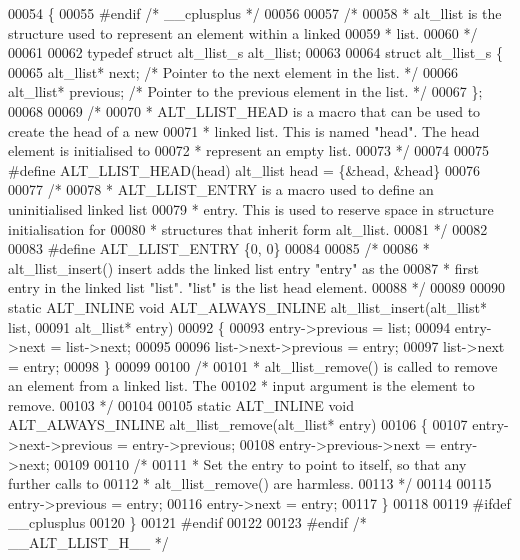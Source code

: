 \begin{DoxyCode}
00054 \{
00055 \textcolor{preprocessor}{#endif }\textcolor{comment}{/* \_\_cplusplus */}\textcolor{preprocessor}{}
00056 
00057 \textcolor{comment}{/*}
00058 \textcolor{comment}{ * alt\_llist is the structure used to represent an element within a linked}
00059 \textcolor{comment}{ * list.}
00060 \textcolor{comment}{ */}
00061 
00062 \textcolor{keyword}{typedef} \textcolor{keyword}{struct }alt_llist_s alt_llist;
00063 
00064 \textcolor{keyword}{struct }alt_llist_s \{
00065   alt_llist* next;     \textcolor{comment}{/* Pointer to the next element in the list. */}
00066   alt_llist* previous; \textcolor{comment}{/* Pointer to the previous element in the list. */}
00067 \};
00068 
00069 \textcolor{comment}{/*}
00070 \textcolor{comment}{ * ALT\_LLIST\_HEAD is a macro that can be used to create the head of a new }
00071 \textcolor{comment}{ * linked list. This is named "head". The head element is initialised to }
00072 \textcolor{comment}{ * represent an empty list.  }
00073 \textcolor{comment}{ */}
00074 
00075 \textcolor{preprocessor}{#define ALT\_LLIST\_HEAD(head) alt\_llist head = \{&head, &head\}}
00076 
00077 \textcolor{comment}{/*}
00078 \textcolor{comment}{ * ALT\_LLIST\_ENTRY is a macro used to define an uninitialised linked list}
00079 \textcolor{comment}{ * entry. This is used to reserve space in structure initialisation for}
00080 \textcolor{comment}{ * structures that inherit form alt\_llist.}
00081 \textcolor{comment}{ */}
00082 
00083 \textcolor{preprocessor}{#define ALT\_LLIST\_ENTRY \{0, 0\}}
00084 
00085 \textcolor{comment}{/*}
00086 \textcolor{comment}{ * alt\_llist\_insert() insert adds the linked list entry "entry" as the }
00087 \textcolor{comment}{ * first entry in the linked list "list". "list" is the list head element.  }
00088 \textcolor{comment}{ */}
00089 
00090 \textcolor{keyword}{static} ALT_INLINE \textcolor{keywordtype}{void} ALT_ALWAYS_INLINE alt_llist_insert(alt_llist* list, 
00091                 alt_llist* entry)
00092 \{
00093   entry->previous = list;
00094   entry->next     = list->next;
00095 
00096   list->next->previous = entry;
00097   list->next           = entry;
00098 \}
00099 
00100 \textcolor{comment}{/*}
00101 \textcolor{comment}{ * alt\_llist\_remove() is called to remove an element from a linked list. The}
00102 \textcolor{comment}{ * input argument is the element to remove.}
00103 \textcolor{comment}{ */}
00104      
00105 \textcolor{keyword}{static} ALT_INLINE \textcolor{keywordtype}{void} ALT_ALWAYS_INLINE alt_llist_remove(alt_llist* entry)
00106 \{
00107   entry->next->previous = entry->previous;
00108   entry->previous->next = entry->next;
00109 
00110   \textcolor{comment}{/* }
00111 \textcolor{comment}{   * Set the entry to point to itself, so that any further calls to}
00112 \textcolor{comment}{   * alt\_llist\_remove() are harmless.}
00113 \textcolor{comment}{   */}
00114 
00115   entry->previous = entry;
00116   entry->next     = entry;
00117 \} 
00118 
00119 \textcolor{preprocessor}{#ifdef \_\_cplusplus}
00120 \}
00121 \textcolor{preprocessor}{#endif}
00122  
00123 \textcolor{preprocessor}{#endif }\textcolor{comment}{/* \_\_ALT\_LLIST\_H\_\_ */}\textcolor{preprocessor}{ }
\end{DoxyCode}
